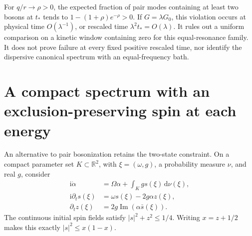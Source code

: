 \documentclass[11pt,a4paper,oneside]{book}
\theoremstyle{plain}
\theoremstyle{definition}
\theoremstyle{remark}
\newcommand{\R}{\mathbb R}
\newcommand{\dd}{\mathrm d}
\newcommand{\ii}{\mathrm i}
\begin{document}
For $q/r\to\rho>0$, the expected fraction of pair modes containing at
least two bosons at $t_*$ tends to $1-(1+\rho)e^{-\rho}>0$.
If $G=\lambda G_0$, this violation occurs at physical time
$O(\lambda^{-1})$, or rescaled time $\lambda^2t_*=O(\lambda)$.
It rules out a uniform comparison on a kinetic window containing zero
for this equal-resonance family.  It does not prove failure at every
fixed positive rescaled time, nor identify the dispersive canonical
spectrum with an equal-frequency bath.

\section{A compact spectrum with an exclusion-preserving spin at each energy}
\label{sec:compact-spin-spectrum}
An alternative to pair bosonization retains the two-state constraint.
On a compact parameter set $K\subset\R^2$, with
$\xi=(\omega,g)$, a probability measure $\nu$, and real $g$, consider
\begin{equation}
 \begin{split}
 \ii\dot\alpha&=\Omega\alpha+\int_K g s(\xi)\,\dd\nu(\xi),\\
 \ii\partial_t s(\xi)&=\omega s(\xi)-2g\alpha z(\xi),\\
 \partial_t z(\xi)&=2g\operatorname{Im}(\alpha\bar s(\xi)).
 \end{split}
 \label{eq:compact-spin-equations}
\end{equation}
The continuous initial spin fields satisfy $|s|^2+z^2\le1/4$.
Writing $x=z+1/2$ makes this exactly $|s|^2\le x(1-x)$.
\end{document}
